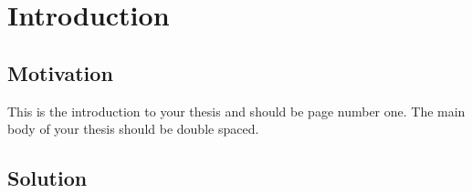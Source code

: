 \chapter{Introduction}

\section{Motivation}

This is the introduction to your thesis and should be page number one.
The main body of your thesis should be double spaced.

\section{Solution}
